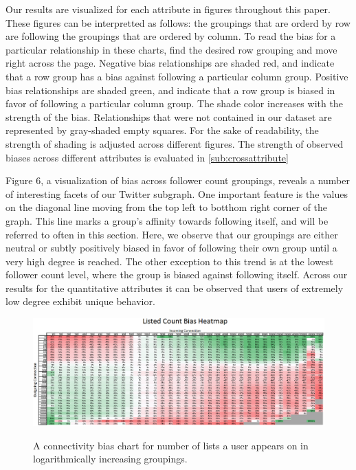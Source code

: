 Our results are visualized for each attribute in figures throughout this paper.  These figures can be interpretted as follows: the groupings that are orderd by row are following the groupings that are ordered by column.  To read the bias for a particular relationship in these charts, find the desired row grouping and move right across the page.  Negative bias relationships are shaded red, and indicate that a row group has a bias against following a particular column group.  Positive bias relationships are shaded green, and indicate that a row group is biased in favor of following a particular column group.  The shade color increases with the strength of the bias.  Relationships that were not contained in our dataset are represented by gray-shaded empty squares.  For the sake of readability, the strength of shading is adjusted across different figures.  The strength of observed biases across different attributes is evaluated in \ref{sub:crossattribute}

Figure 6, a visualization of bias across follower count groupings, reveals a number of interesting facets of our Twitter subgraph.  One important feature is the values on the diagonal line moving from the top left to botthom right corner of the graph.  This line marks a group's affinity towards following itself, and will be referred to often in this section.  Here, we observe that our groupings are either neutral or subtly positively biased in favor of following their own group until a very high degree is reached.  The other exception to this trend is at the lowest follower count level, where the group is biased against following itself.  Across our results for the quantitative attributes it can be observed that users of extremely low degree exhibit unique behavior.

\begin{figure}[t]
 \centering
 \includegraphics[bb=0 0 1026 380, scale=.3]{./images/Bates-Final/listedcount.png}
 \label{fig:listed_count}
 \caption{A connectivity bias chart for number of lists a user appears on in logarithmically increasing groupings.}
\end{figure}

